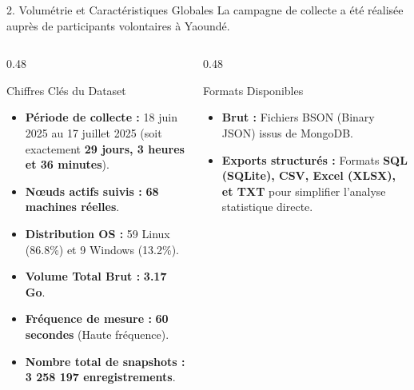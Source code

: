 \documentclass[10pt,aspectratio=169]{beamer}
\begin{document}
\begin{frame}{2. Volumétrie et Caractéristiques Globales}
  La campagne de collecte a été réalisée auprès de participants volontaires à Yaoundé.
  
  \begin{columns}[T]
    \begin{column}{0.48\textwidth}
      \begin{block}{Chiffres Clés du Dataset}
        \begin{itemize}
          \item \textbf{Période de collecte :} 18 juin 2025 au 17 juillet 2025 (soit exactement \textbf{29 jours, 3 heures et 36 minutes}).
          \item \textbf{Nœuds actifs suivis :} \textbf{68 machines réelles}.
          \item \textbf{Distribution OS :} 59 Linux (86.8\%) et 9 Windows (13.2\%).
          \item \textbf{Volume Total Brut :} \textbf{3.17 Go}.
          \item \textbf{Fréquence de mesure :} \textbf{60 secondes} (Haute fréquence).
          \item \textbf{Nombre total de snapshots :} \textbf{3 258 197 enregistrements}.
        \end{itemize}
      \end{block}
    \end{column}
    
    \begin{column}{0.48\textwidth}
      \begin{exampleblock}{Formats Disponibles}
        \begin{itemize}
          \item \textbf{Brut :} Fichiers BSON (Binary JSON) issus de MongoDB.
          \item \textbf{Exports structurés :} Formats \textbf{SQL (SQLite), CSV, Excel (XLSX), et TXT} pour simplifier l'analyse statistique directe.
        \end{itemize}
      \end{exampleblock}
    \end{column}
  \end{columns}
\end{frame}
\end{document}
